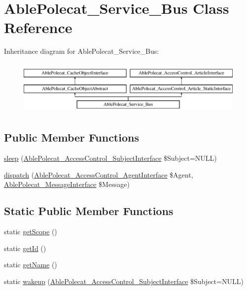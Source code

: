\hypertarget{class_able_polecat___service___bus}{}\section{Able\+Polecat\+\_\+\+Service\+\_\+\+Bus Class Reference}
\label{class_able_polecat___service___bus}
Inheritance diagram for Able\+Polecat\+\_\+\+Service\+\_\+\+Bus\+:\begin{figure}[H]
\begin{center}
\leavevmode
\includegraphics[height=2.709677cm]{class_able_polecat___service___bus}
\end{center}
\end{figure}
\subsection*{Public Member Functions}
\begin{DoxyCompactItemize}
\item 
\hyperlink{class_able_polecat___service___bus_a365e24d7b066205cafa2a5cce3a4f224}{sleep} (\hyperlink{interface_able_polecat___access_control___subject_interface}{Able\+Polecat\+\_\+\+Access\+Control\+\_\+\+Subject\+Interface} \$Subject=N\+U\+L\+L)
\item 
\hyperlink{class_able_polecat___service___bus_a30d06411a0b9a50ac7bd1be30ac53c57}{dispatch} (\hyperlink{interface_able_polecat___access_control___agent_interface}{Able\+Polecat\+\_\+\+Access\+Control\+\_\+\+Agent\+Interface} \$Agent, \hyperlink{interface_able_polecat___message_interface}{Able\+Polecat\+\_\+\+Message\+Interface} \$Message)
\end{DoxyCompactItemize}
\subsection*{Static Public Member Functions}
\begin{DoxyCompactItemize}
\item 
static \hyperlink{class_able_polecat___service___bus_ad9ade868bd136d32967059d1cccb3e92}{get\+Scope} ()
\item 
static \hyperlink{class_able_polecat___service___bus_acfaa3a96d0cb5a4c0d4d710dcba41e9e}{get\+Id} ()
\item 
static \hyperlink{class_able_polecat___service___bus_a4ef9bd37ba3ce8a13c1e8bcf4f72a630}{get\+Name} ()
\item 
static \hyperlink{class_able_polecat___service___bus_a3f2135f6ad45f51d075657f6d20db2cd}{wakeup} (\hyperlink{interface_able_polecat___access_control___subject_interface}{Able\+Polecat\+\_\+\+Access\+Control\+\_\+\+Subject\+Interface} \$Subject=N\+U\+L\+L)
\end{DoxyCompactItemize}
